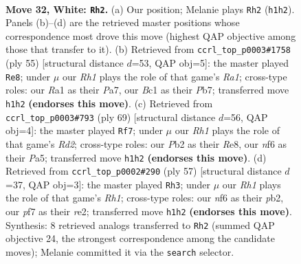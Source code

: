 \documentclass[11pt]{article}
\begin{document}
\clearpage

\begin{figure}[p]\centering
\begin{subfigure}{0.46\textwidth}\centering
\resizebox{\linewidth}{!}{%
\newchessgame
\chessboard[
  setfen={r3k3/5p1r/5n2/8/p3p2p/3p3P/PP3P2/R1BK3R w q - 4 32},
  showmover=false,
  pgfstyle=straightmove, color=movearrow, markmove={h1-h2}
]}
\caption{}
\end{subfigure}\hfill
\begin{subfigure}{0.46\textwidth}\centering
\resizebox{\linewidth}{!}{%
\newchessgame
\chessboard[
  setfen={r5k1/pp1b3r/7p/4R3/3p4/P4N2/2P3PP/R5K1 b - - 2 28},
  showmover=false,
  pgfstyle=straightmove, color=movearrow, markmove={a8-e8}
]}
\caption{}
\end{subfigure}
\\[4pt]
\begin{subfigure}{0.46\textwidth}\centering
\resizebox{\linewidth}{!}{%
\newchessgame
\chessboard[
  setfen={4r3/1k1r2bp/1p1p4/p2N4/2P2P2/1P5P/2R3K1/3R4 b - - 0 35},
  showmover=false,
  pgfstyle=straightmove, color=movearrow, markmove={d7-f7}
]}
\caption{}
\end{subfigure}\hfill
\begin{subfigure}{0.46\textwidth}\centering
\resizebox{\linewidth}{!}{%
\newchessgame
\chessboard[
  setfen={2rbk2r/p4p2/4p3/4P3/2pP2P1/8/PP2R2N/R5K1 b k - 0 29},
  showmover=false,
  pgfstyle=straightmove, color=movearrow, markmove={h8-h3}
]}
\caption{}
\end{subfigure}
\caption{\textbf{Move 32, White: \texttt{Rh2}.} (a) Our position; Melanie plays \texttt{Rh2} (\texttt{h1h2}). Panels (b)--(d) are the retrieved master positions whose correspondence most drove this move (highest QAP objective among those that transfer to it). (b) Retrieved from \texttt{ccrl\_top\_p0003\#1758} (ply 55) [structural distance $d$=53, QAP obj=5]: the master played \texttt{Re8}; under $\mu$ our \emph{Rh1} plays the role of that game's \emph{Ra1}; cross-type roles: our \emph{R}a1 as their \emph{P}a7, our \emph{B}c1 as their \emph{P}b7; transferred move \texttt{h1h2} \textbf{(endorses this move)}. (c) Retrieved from \texttt{ccrl\_top\_p0003\#793} (ply 69) [structural distance $d$=56, QAP obj=4]: the master played \texttt{Rf7}; under $\mu$ our \emph{Rh1} plays the role of that game's \emph{Rd2}; cross-type roles: our \emph{P}b2 as their \emph{R}e8, our \emph{n}f6 as their \emph{P}a5; transferred move \texttt{h1h2} \textbf{(endorses this move)}. (d) Retrieved from \texttt{ccrl\_top\_p0002\#290} (ply 57) [structural distance $d$=37, QAP obj=3]: the master played \texttt{Rh3}; under $\mu$ our \emph{Rh1} plays the role of that game's \emph{Rh1}; cross-type roles: our \emph{n}f6 as their \emph{p}b2, our \emph{p}f7 as their \emph{r}e2; transferred move \texttt{h1h2} \textbf{(endorses this move)}. Synthesis: 8 retrieved analogs transferred to \texttt{Rh2} (summed QAP objective 24, the strongest correspondence among the candidate moves); Melanie committed it via the \texttt{search} selector.}
\label{fig:thought-m62}
\end{figure}
\end{document}
